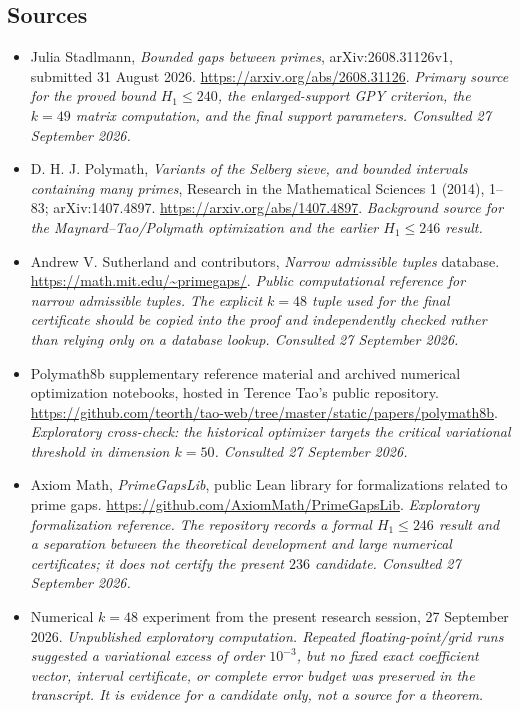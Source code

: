 \documentclass[11pt]{article}
\begin{document}
\subsection{Sources}
\begin{itemize}
\item[S1] Julia Stadlmann, \emph{Bounded gaps between primes}, arXiv:2608.31126v1, submitted 31 August 2026.
\url{https://arxiv.org/abs/2608.31126}.
\textit{Primary source for the proved bound $H_1\le240$, the enlarged-support GPY criterion, the $k=49$ matrix computation, and the final support parameters. Consulted 27 September 2026.}

\item[S2] D. H. J. Polymath, \emph{Variants of the Selberg sieve, and bounded intervals containing many primes}, Research in the Mathematical Sciences 1 (2014), 1--83; arXiv:1407.4897.
\url{https://arxiv.org/abs/1407.4897}.
\textit{Background source for the Maynard--Tao/Polymath optimization and the earlier $H_1\le246$ result.}

\item[S3] Andrew V. Sutherland and contributors, \emph{Narrow admissible tuples} database.
\url{https://math.mit.edu/~primegaps/}.
\textit{Public computational reference for narrow admissible tuples.  The explicit $k=48$ tuple used for the final certificate should be copied into the proof and independently checked rather than relying only on a database lookup. Consulted 27 September 2026.}

\item[E1] Polymath8b supplementary reference material and archived numerical optimization notebooks, hosted in Terence Tao's public repository.
\url{https://github.com/teorth/tao-web/tree/master/static/papers/polymath8b}.
\textit{Exploratory cross-check: the historical optimizer targets the critical variational threshold in dimension $k=50$. Consulted 27 September 2026.}

\item[E2] Axiom Math, \emph{PrimeGapsLib}, public Lean library for formalizations related to prime gaps.
\url{https://github.com/AxiomMath/PrimeGapsLib}.
\textit{Exploratory formalization reference.  The repository records a formal $H_1\le246$ result and a separation between the theoretical development and large numerical certificates; it does not certify the present $236$ candidate. Consulted 27 September 2026.}

\item[N1] Numerical $k=48$ experiment from the present research session, 27 September 2026.
\textit{Unpublished exploratory computation.  Repeated floating-point/grid runs suggested a variational excess of order $10^{-3}$, but no fixed exact coefficient vector, interval certificate, or complete error budget was preserved in the transcript.  It is evidence for a candidate only, not a source for a theorem.}
\end{itemize}
\end{document}
